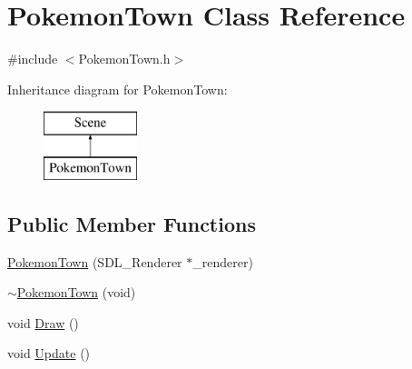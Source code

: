 \hypertarget{class_pokemon_town}{\section{Pokemon\-Town Class Reference}
\label{class_pokemon_town}
}


{\ttfamily \#include $<$Pokemon\-Town.\-h$>$}

Inheritance diagram for Pokemon\-Town\-:\begin{figure}[H]
\begin{center}
\leavevmode
\includegraphics[height=2.000000cm]{class_pokemon_town}
\end{center}
\end{figure}
\subsection*{Public Member Functions}
\begin{DoxyCompactItemize}
\item 
\hyperlink{class_pokemon_town_a999ed4c76a1fa931a6c0acb984d71caf}{Pokemon\-Town} (S\-D\-L\-\_\-\-Renderer $\ast$\-\_\-renderer)
\item 
\hyperlink{class_pokemon_town_af68c21ca9996cd73a35167a290d2ba01}{$\sim$\-Pokemon\-Town} (void)
\item 
void \hyperlink{class_pokemon_town_a72cdaf8645ec395b4ee351dbe3a7c097}{Draw} ()
\item 
void \hyperlink{class_pokemon_town_a61a3f5e9b30126be3fa657d29877d596}{Update} ()
\end{DoxyCompactItemize}


